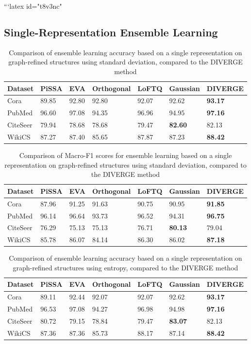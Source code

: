 \documentclass{article}
\begin{document}
```latex id="t8v3nc"
\subsection{Single-Representation Ensemble Learning}

\begin{table}[ht]
\centering
\caption{
Comparison of ensemble learning accuracy based on a single representation
on graph-refined structures using standard deviation,
compared to the DIVERGE method
}
\begin{tabularx}{\textwidth}{l||XXXXXX}
\hline
Dataset & PiSSA & EVA & Orthogonal & LoFTQ & Gaussian & DIVERGE \\
\hline
\hline
Cora     & 89.85 & 92.80 & 92.80 & 92.07 & 92.62 & \textbf{93.17} \\
PubMed   & 96.60 & 97.08 & 94.35 & 96.96 & 94.95 & \textbf{97.16} \\
CiteSeer & 79.94 & 78.68 & 78.68 & 79.47 & \textbf{82.60} & 82.13 \\
WikiCS   & 87.27 & 87.40 & 85.65 & 87.87 & 87.23 & \textbf{88.42} \\
\hline
\end{tabularx}
\end{table}

\begin{table}[ht]
\centering
\caption{
Comparison of Macro-F1 scores for ensemble learning based on a single representation
on graph-refined structures using standard deviation,
compared to the DIVERGE method
}
\begin{tabularx}{\textwidth}{l||XXXXXX}
\hline
Dataset & PiSSA & EVA & Orthogonal & LoFTQ & Gaussian & DIVERGE \\
\hline
\hline
Cora     & 87.96 & 91.25 & 91.63 & 90.75 & 90.95 & \textbf{91.85} \\
PubMed   & 96.14 & 96.64 & 93.73 & 96.52 & 94.31 & \textbf{96.75} \\
CiteSeer & 76.29 & 75.13 & 75.13 & 76.71 & \textbf{80.13} & 79.04 \\
WikiCS   & 85.78 & 86.07 & 84.14 & 86.30 & 86.02 & \textbf{87.18} \\
\hline
\end{tabularx}
\end{table}

\begin{table}[ht]
\centering
\caption{
Comparison of ensemble learning accuracy based on a single representation
on graph-refined structures using entropy,
compared to the DIVERGE method
}
\begin{tabularx}{\linewidth}{l||XXXXXX}
\hline
Dataset & PiSSA & EVA & Orthogonal & LoFTQ & Gaussian & DIVERGE \\ 
\hline
\hline
Cora     & 89.11 & 92.44 & 92.07 & 92.07 & 92.62 & \textbf{93.17} \\ 
PubMed   & 96.53 & 97.08 & 94.27 & 96.98 & 94.98 & \textbf{97.16} \\ 
CiteSeer & 80.72 & 79.15 & 78.84 & 79.47 & \textbf{83.07} & 82.13 \\ 
WikiCS   & 87.36 & 87.36 & 85.73 & 88.17 & 87.14 & \textbf{88.42} \\ 
\hline
\end{tabularx}
\end{table}
\end{document}

